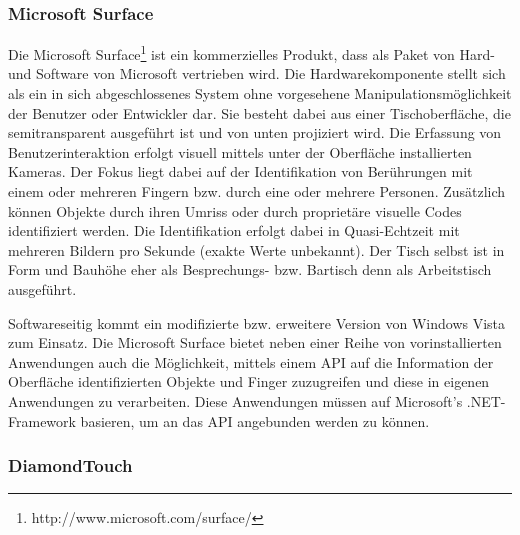 
\subsubsection{Microsoft Surface} %
\label{ssub:microsoft_surface}

Die Microsoft Surface\footnote{http://www.microsoft.com/surface/} ist ein kommerzielles Produkt, dass als Paket von Hard- und Software von Microsoft vertrieben wird. Die Hardwarekomponente stellt sich als ein in sich abgeschlossenes System ohne vorgesehene Manipulationsmöglichkeit der Benutzer oder Entwickler dar. Sie besteht dabei aus einer Tischoberfläche, die semitransparent ausgeführt ist und von unten projiziert wird. Die Erfassung von Benutzerinteraktion erfolgt visuell mittels unter der Oberfläche installierten Kameras. Der Fokus liegt dabei auf der Identifikation von Berührungen mit einem oder mehreren Fingern bzw. durch eine oder mehrere Personen. Zusätzlich können Objekte durch ihren Umriss oder durch proprietäre visuelle Codes identifiziert werden. Die Identifikation erfolgt dabei in Quasi-Echtzeit mit mehreren Bildern pro Sekunde (exakte Werte unbekannt). Der Tisch selbst ist in Form und Bauhöhe eher als Besprechungs- bzw. Bartisch denn als Arbeitstisch ausgeführt.

Softwareseitig kommt ein modifizierte bzw. erweitere Version von Windows Vista zum Einsatz. Die Microsoft Surface bietet neben einer Reihe von vorinstallierten Anwendungen auch die Möglichkeit, mittels einem \gls{API} auf die Information der Oberfläche identifizierten Objekte und Finger zuzugreifen und diese in eigenen Anwendungen zu verarbeiten. Diese Anwendungen müssen auf Microsoft's .NET-Framework basieren, um an das \gls{API} angebunden werden zu können. 


\subsubsection{DiamondTouch} %
\label{ssub:diamond_touch}

